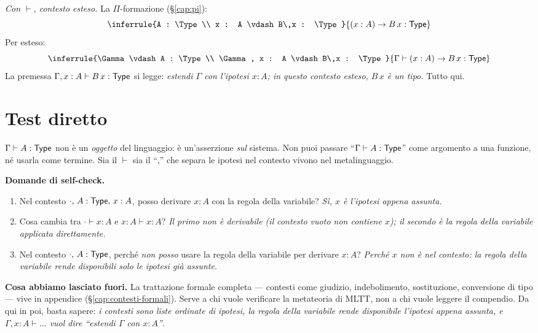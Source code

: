 \medskip

\noindent \emph{Con $\vdash$, contesto esteso.} La $\Pi$-formazione (\S\ref{cap:pi}):
\[
\inferrule{A : \Type \\ x : A \vdash B\,x : \Type}{(x : A) \to B\,x : \Type}
\]
Per esteso:
\[
\inferrule{\Gamma \vdash A : \Type \\ \Gamma, x : A \vdash B\,x : \Type}{\Gamma \vdash (x : A) \to B\,x : \Type}
\]
\noindent La premessa $\Gamma, x : A \vdash B\,x : \mathsf{Type}$ si legge: \emph{estendi $\Gamma$ con l'ipotesi $x : A$; in questo contesto esteso, $B\,x$ \`e un tipo.} Tutto qui.

\section*{Test diretto}

\begin{oss}
$\Gamma \vdash A : \mathsf{Type}$ non \`e un \emph{oggetto} del linguaggio: \`e un'asserzione \emph{sul} sistema. Non puoi passare ``$\Gamma \vdash A : \mathsf{Type}$'' come argomento a una funzione, n\'e usarla come termine. Sia il $\vdash$ sia il ``,'' che separa le ipotesi nel contesto vivono nel metalinguaggio.
\end{oss}

\bigskip

\noindent\textbf{Domande di self-check.}
\begin{enumerate}
\item Nel contesto $\cdot,\, A : \mathsf{Type},\, x : A$, posso derivare $x : A$ con la regola della variabile? \emph{S\`i, $x$ \`e l'ipotesi appena assunta.}
\item Cosa cambia tra $\cdot \vdash x : A$ e $x : A \vdash x : A$? \emph{Il primo non \`e derivabile (il contesto vuoto non contiene $x$); il secondo \`e la regola della variabile applicata direttamente.}
\item Nel contesto $\cdot,\, A : \mathsf{Type}$, perch\'e \emph{non posso} usare la regola della variabile per derivare $x : A$? \emph{Perch\'e $x$ non \`e nel contesto: la regola della variabile rende disponibili solo le ipotesi gi\`a assunte.}
\end{enumerate}

\bigskip

\noindent\textbf{Cosa abbiamo lasciato fuori.} La trattazione formale completa --- contesti come giudizio, indebolimento, sostituzione, conversione di tipo --- vive in appendice (\S\ref{cap:contesti-formali}). Serve a chi vuole verificare la metateoria di MLTT, non a chi vuole leggere il compendio. Da qui in poi, basta sapere: \emph{i contesti sono liste ordinate di ipotesi, la regola della variabile rende disponibile l'ipotesi appena assunta, e $\Gamma, x : A \vdash \ldots$ vuol dire ``estendi $\Gamma$ con $x : A$''}.

